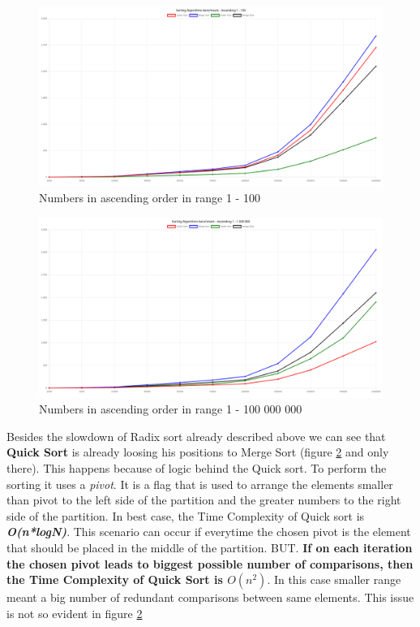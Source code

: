 \documentclass[12pt]{article}
\begin{document}
\begin{figure}[h]
    \centering
    \includegraphics[width=1\textwidth]{ascen100.png}
    \caption{Numbers in ascending order in range 1 - 100}
    \label{fig:ascending100}
\end{figure}

\begin{figure}[h]
    \centering
    \includegraphics[width=1\textwidth]{ascen1000000.png}
    \caption{Numbers in ascending order in range 1 - 100 000 000}
    \label{fig:ascending1000000}
\end{figure}
\clearpage
Besides the slowdown of Radix sort already described above we can see that \textbf{Quick Sort} is already loosing
his positions to Merge Sort (figure \ref{fig:ascending1000000} and only there). This happens because of logic behind the Quick sort. To 
perform the sorting it uses a \textit{pivot}. It is a flag that is used to arrange the 
elements smaller than pivot to the left side of the partition 
and the greater numbers to the right side of the partition. 
In best case, the Time Complexity of Quick sort 
is \textbf{\textit{O(n*logN)}}. This scenario can occur if everytime the chosen pivot is the element that should
be placed in the middle of the partition. BUT. \textbf{If on each iteration the chosen pivot 
leads to biggest possible number of comparisons, then the Time Complexity 
of Quick Sort is \textit{$O(n^2)$}}. In this case smaller range meant a big number of redundant comparisons 
between same elements. This issue is not so evident in figure \ref{fig:ascending1000000}
\end{document}
